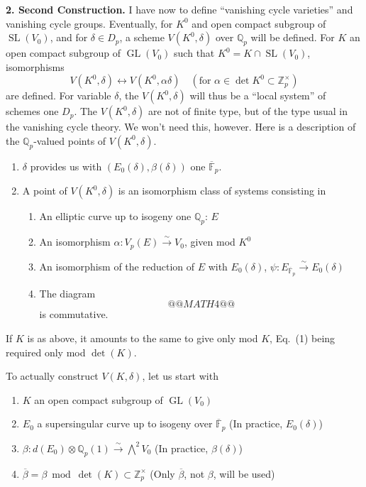 \documentclass[11pt,a4paper]{article}
\theoremstyle{plain}
\theoremstyle{definition}
\theoremstyle{remark}
\DeclareMathOperator{\GL}{GL}
\DeclareMathOperator{\SL}{SL}
\newcommand{\Z}{\mathbb{Z}}
\newcommand{\Fpbar}{\overline{\mathbb{F}}_{p}}
\newcommand{\Qp}{\mathbb{Q}_{p}}
\newcommand{\Vp}{V_{p}}
\begin{document}
\medskip

\noindent
\textbf{2. Second Construction.} I have now to define ``vanishing cycle varieties'' and vanishing cycle groups. Eventually, for $K^{0}$ and open compact subgroup of $\SL(V_{0})$, and for $\delta \in D_{p}$, a scheme $V(K^{0}, \delta)$ over $\Qp$ will be defined. For $K$ an open compact subgroup of $\GL(V_{0})$ such that $K^{0} = K \cap \SL(V_{0})$, isomorphisms
\[
V(K^{0}, \delta) \leftrightarrow V(K^{0}, \alpha\delta) \quad (\text{for } \alpha \in \det K^{0} \subset \Z_{p}^{\times})
\]
are defined. For variable $\delta$, the $V(K^{0}, \delta)$ will thus be a ``local system'' of schemes one $D_{p}$. The $V(K^{0}, \delta)$ are not of finite type, but of the type usual in the vanishing cycle theory. We won't need this, however. Here is a description of the $\Qp$-valued points of $V(K^{0}, \delta)$.
\begin{enumerate}[label=(\alph*)]
\item $\delta$ provides us with $(E_{0}(\delta), \beta(\delta))$ one $\Fpbar$.
\item A point of $V(K^{0}, \delta)$ is an isomorphism class of systems consisting in
\begin{enumerate}[label=(\arabic*)]
\item An elliptic curve up to isogeny one $\Qp$: $E$
\item An isomorphism $\alpha : \Vp(E) \xrightarrow{\sim} V_{0}$, given mod $K^{0}$
\item An isomorphism of the reduction of $E$ with $E_{0}(\delta)$, $\psi : E_{\Fpbar} \xrightarrow{\sim} E_{0}(\delta)$
\item The diagram
\[
@@MATH4@@
\]
is commutative.
\end{enumerate}
\end{enumerate}
If $K$ is as above, it amounts to the same to give only mod $K$, Eq.\ (1) being required only mod $\det(K)$.

To actually construct $V(K, \delta)$, let us start with
\begin{enumerate}[label=(\alph*)]
\item $K$ an open compact subgroup of $\GL(V_{0})$
\item $E_{0}$ a supersingular curve up to isogeny over $\Fpbar$ (In practice, $E_{0}(\delta)$)
\item $\beta : d(E_{0}) \otimes \Qp(1) \xrightarrow{\sim} \bigwedge^{2} V_{0}$ (In practice, $\beta(\delta)$)
\item $\overline{\beta} = \beta \bmod \det(K) \subset \Z_{p}^{\times}$ (Only $\overline{\beta}$, not $\beta$, will be used)
\end{enumerate}
\end{document}
